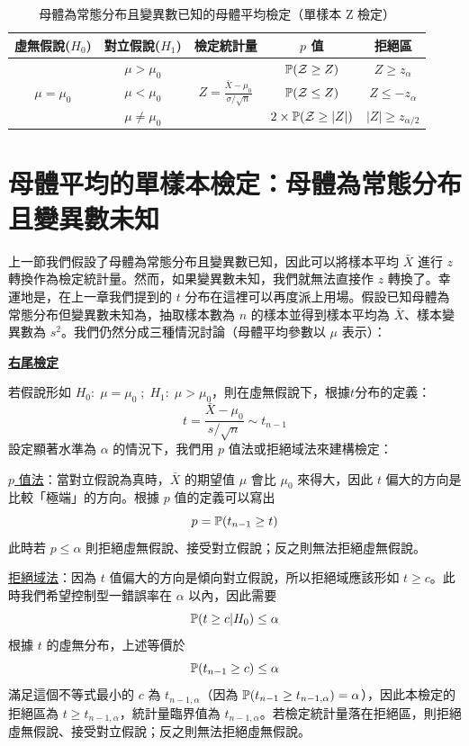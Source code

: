     \begin{table}[htbp]
        \begin{center}
            \begin{tabular}{ccccc}
                \toprule
                虛無假說($H_0$) & 對立假說($H_1$) & 檢定統計量 & $p$ 值 & 拒絕區\\
                \hline
                \multirow{3}{*}{$\mu = \mu_0$} & $\mu > \mu_0$ & \multirow{3}{*}{$Z = \frac{\bar{X}-\mu_0}{\sigma/\sqrt{n}}$} & $\mathbb{P}(\mathcal{Z} \ge Z)$ & $Z \ge z_{\alpha}$\\
                & $\mu < \mu_0$ & &$\mathbb{P}(\mathcal{Z} \le Z)$&$Z \le -z_{\alpha}$\\
                & $\mu \ne \mu_0$ & &$2\times\mathbb{P}(\mathcal{Z} \ge |Z|)$&$|Z| \ge z_{\alpha/2}$\\
                \bottomrule
            \end{tabular}
            \caption{母體為常態分布且變異數已知的母體平均檢定（單樣本 Z 檢定）\label{tab:one_sample_z}}
        \end{center}
    \end{table}
    
\section{母體平均的單樣本檢定：母體為常態分布且變異數未知}

    上一節我們假設了母體為常態分布且變異數已知，因此可以將樣本平均 $\bar{X}$ 進行 $z$ 轉換作為檢定統計量。然而，如果變異數未知，我們就無法直接作 $z$ 轉換了。幸運地是，在上一章我們提到的 $t$ 分布在這裡可以再度派上用場。假設已知母體為常態分布但變異數未知為，抽取樣本數為 $n$ 的樣本並得到樣本平均為 $\bar{X}$、樣本變異數為 $s^2$。我們仍然分成三種情況討論（母體平均參數以 $\mu$ 表示）：

    \noindent\underline{\textbf{右尾檢定}}

    若假說形如 $H_0: \; \mu = \mu_0 \; ; \; H_1: \; \mu > \mu_0$，則在虛無假說下，根據$t$分布的定義：
    \[t = \frac{\bar{X}-\mu_0}{s/\sqrt{n}} \sim t_{n-1}\]
    設定顯著水準為 $\alpha$ 的情況下，我們用 $p$ 值法或拒絕域法來建構檢定：

    \noindent \underline{$p$ 值法}：當對立假說為真時，$\bar{X}$ 的期望值 $\mu$ 會比 $\mu_0$ 來得大，因此 $t$ 偏大的方向是比較「極端」的方向。根據 $p$ 值的定義可以寫出
    \[p = \mathbb{P}(t_{n-1} \ge t)\]
    此時若 $p \le \alpha$ 則拒絕虛無假說、接受對立假說；反之則無法拒絕虛無假說。
    
    \noindent \underline{拒絕域法}：因為 $t$ 值偏大的方向是傾向對立假說，所以拒絕域應該形如 $t \ge c$。此時我們希望控制型一錯誤率在 $\alpha$ 以內，因此需要
    \[\mathbb{P}(t \ge c|H_0) \le \alpha\]
    根據 $t$ 的虛無分布，上述等價於
    \[\mathbb{P}(t_{n-1} \ge c) \le \alpha\]
    滿足這個不等式最小的 $c$ 為 $t_{n-1,\alpha}$（因為 $\mathbb{P}(t_{n-1} \ge t_{n-1,\alpha}) = \alpha$），因此本檢定的拒絕區為 $t \ge t_{n-1,\alpha}$，統計量臨界值為 $t_{n-1,\alpha}$。若檢定統計量落在拒絕區，則拒絕虛無假說、接受對立假說；反之則無法拒絕虛無假說。

